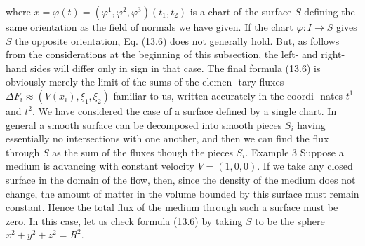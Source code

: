 where $x = \varphi(t) = (\varphi^1, \varphi^2, \varphi^3)(t_1, t_2)$ is a chart of the surface $S$ defining the same
orientation as the field of normals we have given. If the chart $\varphi : I \to S$ gives $S$ the
opposite orientation, Eq. (13.6) does not generally hold. But, as follows from the
considerations at the beginning of this subsection, the left- and right-hand sides will
differ only in sign in that case.
The final formula (13.6) is obviously merely the limit of the sums of the elemen-
tary fluxes $\Delta F_i \approx (V(x_i), \xi_1, \xi_2)$ familiar to us, written accurately in the coordi-
nates $t^1$ and $t^2$.
We have considered the case of a surface defined by a single chart. In general
a smooth surface can be decomposed into smooth pieces $S_i$ having essentially no
intersections with one another, and then we can find the flux through $S$ as the sum
of the fluxes though the pieces $S_i$.
Example 3 Suppose a medium is advancing with constant velocity $V = (1, 0, 0)$.
If we take any closed surface in the domain of the flow, then, since the density of
the medium does not change, the amount of matter in the volume bounded by this
surface must remain constant. Hence the total flux of the medium through such a
surface must be zero.
In this case, let us check formula (13.6) by taking $S$ to be the sphere $x^2 + y^2 +
z^2 = R^2$.